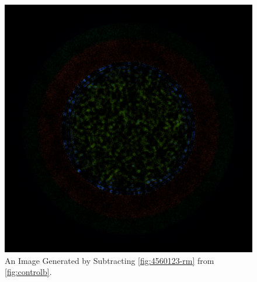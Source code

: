 \begin{figure}[H]
\centering
\includegraphics[width=0.6\linewidth]{figures/shuffle/diff-4560123}
\caption{An Image Generated by Subtracting \ref{fig:4560123-rm} from \ref{fig:controlb}.}
\label{fig:diff-4560123}
\end{figure}